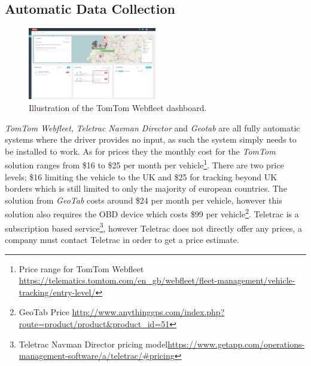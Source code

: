 \subsection{Automatic Data Collection}%
\begin{figure}[h!]
    \centering
    \includegraphics[width=0.5\textwidth]{img/tomtom_webfleet.jpeg}
    \caption{Illustration of the TomTom Webfleet dashboard.}
    \label{fig:TomTom_Webfleet}
\end{figure}
\textit{TomTom Webfleet}, \textit{Teletrac Navman Director} and \textit{Geotab} are all fully automatic systems where the driver provides no input, as such the system simply needs to be installed to work.
As for prices they the monthly cost for the \textit{TomTom} solution ranges from \$16 to \$25 per month per vehicle\footnote{Price range for TomTom Webfleet\\ \url{https://telematics.tomtom.com/en_gb/webfleet/fleet-management/vehicle-tracking/entry-level/}}.
There are two price levels; \$16 limiting the vehicle to the UK and \$25 for tracking beyond UK borders which is still limited to only the majority of european countries.
The solution from \textit{GeoTab} costs around \$24 per month per vehicle, however this solution also requires the OBD device which costs \$99 per vehicle\footnote{GeoTab Price \url{http://www.anythinggps.com/index.php?route=product/product&product_id=51}}.
Teletrac is a subscription based service\footnote{Teletrac Navman Director pricing model\url{https://www.getapp.com/operations-management-software/a/teletrac/#pricing}}, however Teletrac does not directly offer any prices, a company must contact Teletrac in order to get a price estimate.


